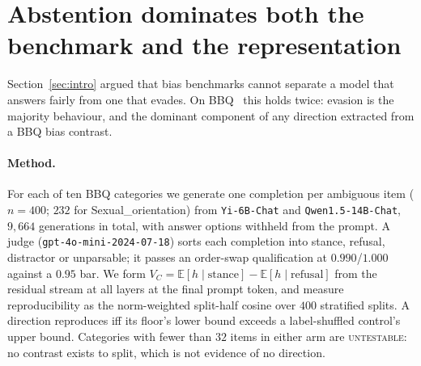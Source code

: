 %
%
%
%
%

\section{Abstention dominates both the benchmark and the representation}
\label{sec:run3}

Section~\ref{sec:intro} argued that bias benchmarks cannot separate a model that
answers fairly from one that evades. On BBQ~\citep{parrish2022bbq} this holds
twice: evasion is the majority behaviour, and the dominant component of any
direction extracted from a BBQ bias contrast.

\paragraph{Method.}
For each of ten BBQ categories we generate one completion per ambiguous item
($n{=}400$; $232$ for Sexual\_orientation) from \texttt{Yi-6B-Chat} and
\texttt{Qwen1.5-14B-Chat}, $9{,}664$ generations in total, with answer options
withheld from the prompt. A judge (\texttt{gpt-4o-mini-2024-07-18}) sorts each
completion into stance, refusal, distractor or unparsable; it passes an
order-swap qualification at $0.990$/$1.000$ against a $0.95$ bar. We form $V_C = \mathbb{E}[h \mid \text{stance}] - \mathbb{E}[h \mid
\text{refusal}]$ from the residual stream at all layers at the final prompt
token, and measure reproducibility as the norm-weighted split-half cosine over
$400$ stratified splits. A direction reproduces iff its floor's lower bound
exceeds a label-shuffled control's upper bound. Categories with fewer than $32$
items in either arm are \textsc{untestable}: no contrast exists to split, which
is not evidence of no direction.

